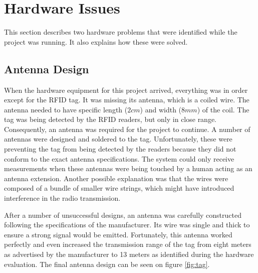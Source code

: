 
\section{Hardware Issues}
\label{sec:hardiss}

This section describes two hardware problems that were identified while the project was running. It also explains how these were solved.

\subsection{Antenna Design}
\label{subsec:antdes}

When the hardware equipment for this project arrived, everything was in order except for the RFID tag. It was missing its antenna, which is a coiled wire. The antenna needed to have specific length ($2cm$) and width ($8mm$) of the coil. The tag was being detected by the RFID readers, but only in close range. Consequently, an antenna was required for the project to continue. A number of antennas were designed and soldered to the tag. Unfortunately, these were preventing the tag from being detected by the readers because they did not conform to the exact antenna specifications. The system could only receive measurements when these antennas were being touched by a human acting as an antenna extension. Another possible explanation was that the wires were composed of a bundle of smaller wire strings, which might have introduced interference in the radio transmission.

After a number of unsuccessful designs, an antenna was carefully constructed following the specifications of the manufacturer. Its wire was single and thick to ensure a strong signal would be emitted. Fortunately, this antenna worked perfectly and even increased the transmission range of the tag from eight meters as advertised by the manufacturer to 13 meters as identified during the hardware evaluation. The final antenna design can be seen on figure \ref{fig:tag}.

